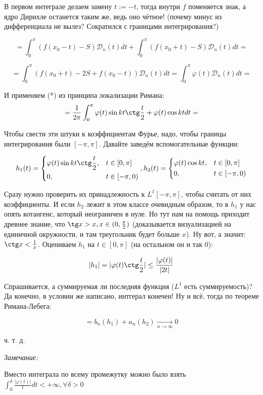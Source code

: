 \documentclass{article}
\def\goesto#1{\underset{#1}{\longrightarrow}}
\def\toinf#1{\goesto{#1 \rightarrow \infty}}
\def\ntoinf{\toinf{n}}
\def\DD{\mathcal{D}}
\begin{document}
В первом интеграле делаем замену $t := -t$, тогда внутри $f$ поменяется знак, а ядро Дирихле останется таким же, ведь оно чётное! (почему минус из дифференциала не вылез? Сократился с границами интегрирования?)

\[ = \int_{0}^{\pi}(f(x_0 - t) - S)\DD_n(t) dt + \int_{0}^{\pi} (f(x_0 + t) - S)\DD_n(t) dt = \]

\[ = \int_{0}^{\pi}(f(x_0 + t) - 2S + f(x_0 - t))\DD_n(t) dt = \int_{0}^{\pi} \varphi(t)\DD_n(t)dt = \]

И применяем (*) из принципа локализации Римана:
\[ = \frac{1}{2\pi} \int_{0}^{\pi} \varphi(t) \sin kt \ctg \frac{t}{2} + \varphi(t) \cos kt dt = \]

Чтобы свести эти штуки к коэффициентам Фурье, надо, чтобы границы интегрирования были $[-\pi, \pi]$. Давайте заведём вспомогательные функции:

\[h_1(t) = \begin{dcases}
    \varphi(t)\sin kt \ctg \frac{t}{2}, &t \in [0, \pi] \\
    0, &t \in[-\pi, 0)
\end{dcases}, h_2(t) = \begin{dcases}
    \varphi(t)\cos kt, &t \in [0, \pi] \\
    0, &t \in[-\pi, 0)
\end{dcases}\]

Сразу нужно проверить их принадлежность к $L^1[-\pi, \pi]$, чтобы считать от них коэффициенты. И если $h_2$ лежит в этом классе очевидным образом, то в $h_1$ у нас опять котангенс, который неограничен в нуле. Но тут нам на помощь приходит древнее знание, что $\tg x > x, x \in (0, \frac{\pi}{2})$ (доказывается визуализацией на единичной окружности, и там треугольник будет больше $x$). Ну вот, а значит: $\ctg x < \frac{1}{x}$. Оцениваем $h_1$ на $t \in [0, \pi]$ (на остальном он и так 0):

\[|h_1| = |\varphi(t)\ctg \frac{t}{2}| \le \frac{|\varphi(t)|}{|2t|}\]

Спрашивается, а суммируемая ли последняя функция ($L^1$ есть суммируемость)? Да конечно, в условии же написано, интгерал конечен! Ну и всё, тогда по теореме Римана-Лебега:

\[ = b_n(h_1) + a_n(h_2) \ntoinf 0\]

ч. т. д. 

\textit{Замечание:}

Вместо интеграла по всему промежутку можно было взять $\int_0^\delta \frac{|\varphi(t)|}{t} dt < + \infty, \forall \delta > 0$
\end{document}
